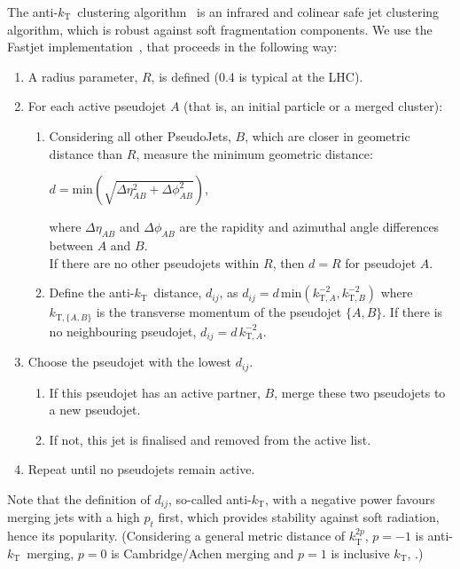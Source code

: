 \documentclass{webofc}
\newcommand{\akt}{anti-${k}_\text{T}$}
\begin{document}
The \akt\ clustering algorithm~\cite{Cacciari:2005hq,Matteo_Cacciari_2008}
is an infrared and colinear safe jet clustering algorithm, which is robust
against soft fragmentation components. We use the Fastjet
implementation~\cite{Cacciari:2011ma}, that proceeds in the following way:

\begin{enumerate}[itemsep=2pt,parsep=2pt,partopsep=0pt]
  \item A radius parameter, $R$, is defined (0.4 is typical at the LHC).
  \item For each active pseudojet $A$ (that is, an initial particle or a merged cluster):
  \begin{enumerate}
    \item Considering all other PseudoJets, $B$, which are closer in geometric
    distance than $R$, measure the minimum geometric distance:
    \begin{center}
      $d=\mathrm{min}\left( \sqrt{\Delta\eta_{AB}^2 + \Delta\phi_{AB}^2} \right)$,  
    \end{center}
    where $\Delta\eta_{AB}$ and $\Delta\phi_{AB}$ are the rapidity and azimuthal
    angle differences between $A$ and $B$.\\If there are no other pseudojets within $R$,
    then $d=R$ for pseudojet $A$.
    \item Define the \akt\ distance, $d_{ij}$, as $d_{ij} = d \,
    \mathrm{min}(k^{-2}_{\text{T},A}, k^{-2}_{\text{T},B})$ where
    $k_{\text{T},\{A,B\}}$ is the transverse momentum of the pseudojet $\{A,B\}$.
    If there is no neighbouring pseudojet, $d_{ij} = d \, k^{-2}_{\text{T},A}$.
  \end{enumerate}
  \item Choose the pseudojet with the lowest $d_{ij}$.
  \begin{enumerate}
    \item If this pseudojet has an active partner, $B$, merge these two
    pseudojets to a new pseudojet.
    \item If not, this jet is finalised and removed from the active list.
  \end{enumerate}
  \item Repeat until no pseudojets remain active.
\end{enumerate}

Note that the definition of $d_{ij}$, so-called \akt, with a negative power
favours merging jets with a high $p_t$ first, which provides stability against
soft radiation, hence its popularity. (Considering a general metric distance of
$k^{2p}_\text{T}$, $p=-1$ is \akt\ merging, $p=0$ is Cambridge/Achen merging and
$p=1$ is inclusive $k_\text{T}$, \cite{Matteo_Cacciari_2008}.)
\end{document}

